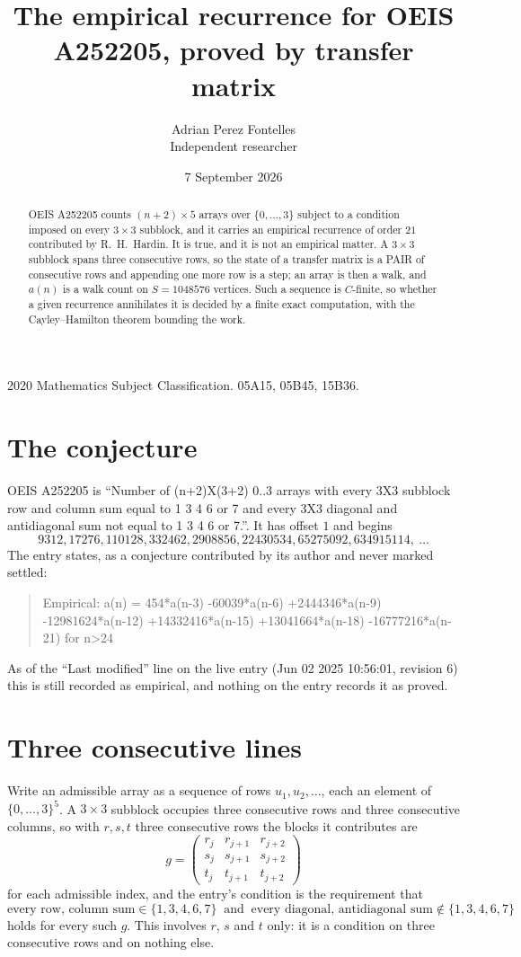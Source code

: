 \documentclass[11pt,a4paper]{article}
\title{The empirical recurrence for OEIS A252205, proved by transfer matrix}
\author{Adrian Perez Fontelles\\ \small Independent researcher}
\date{7 September 2026}
\theoremstyle{plain}
\theoremstyle{definition}
\begin{document}
\maketitle

\begin{abstract}
OEIS A252205 counts $(n+2)\times5$ arrays over $\{0,\dots,3\}$ subject to a condition imposed on
every $3\times3$ subblock, and it carries an empirical recurrence of order $21$
contributed by R.~H.~Hardin. It is true, and it is not an empirical matter. A $3\times3$
subblock spans three consecutive rows, so the state of a transfer matrix is a PAIR of
consecutive rows and appending one more row is a step; an array is then a walk, and
$a(n)$ is a walk count on $S=1048576$ vertices. Such a sequence is $C$-finite, so whether a given
recurrence annihilates it is decided by a finite exact computation, with the Cayley--Hamilton
theorem bounding the work.
\end{abstract}

\noindent\small 2020 Mathematics Subject Classification. 05A15, 05B45, 15B36.\normalsize

\section{The conjecture}

OEIS A252205 is ``Number of (n+2)X(3+2) 0..3 arrays with every 3X3 subblock row and column sum equal to 1 3 4 6 or 7 and every 3X3 diagonal and antidiagonal sum not equal to 1 3 4 6 or 7.''. It has offset $1$ and begins
\[
9312, 17276, 110128, 332462, 2908856, 22430534, 65275092, 634915114,\ \dots
\]
The entry states, as a conjecture contributed by its author and never marked settled:
\begin{quote}
Empirical: a(n) = 454*a(n-3) -60039*a(n-6) +2444346*a(n-9) -12981624*a(n-12) +14332416*a(n-15) +13041664*a(n-18) -16777216*a(n-21) for n>24
\end{quote}
As of the ``Last modified'' line on the live entry (Jun 02 2025 10:56:01, revision 6) this is still
recorded as empirical, and nothing on the entry records it as proved.

\section{Three consecutive lines}

Write an admissible array as a sequence of rows $u_1,u_2,\dots$, each an element of
$\{0,\dots,3\}^{5}$. A $3\times3$ subblock occupies three consecutive rows and
three consecutive columns, so with $r,s,t$ three consecutive rows the blocks it
contributes are
\[
g=\begin{pmatrix}r_j&r_{j+1}&r_{j+2}\\ s_j&s_{j+1}&s_{j+2}\\ t_j&t_{j+1}&t_{j+2}\end{pmatrix}
\]
for each admissible index, and the entry's condition is the requirement that
\[
\text{every row, column sum} \in \{1,3,4,6,7\}\ \text{ and }\ \text{every diagonal, antidiagonal sum} \notin \{1,3,4,6,7\}
\]
holds for every such $g$. This involves $r$, $s$ and $t$ only: it is a condition on
three consecutive rows and on nothing else.
\end{document}
